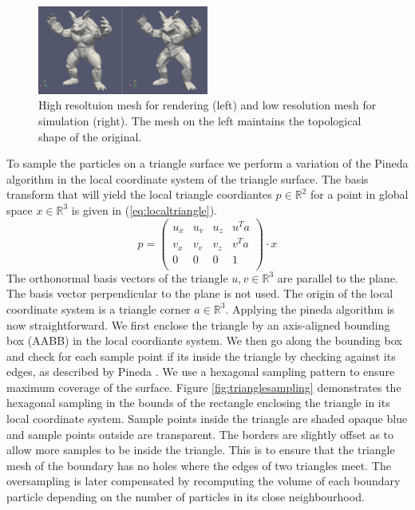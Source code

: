 \documentclass[11pt, letterpaper, twocolumn]{article}
\begin{document}
\begin{figure}[ht]
    \centering
    \includegraphics[width=0.5\textwidth]{images/mesh.png}
    \caption{High resoltuion mesh for rendering (left) and low resolution mesh for simulation (right). The mesh on the left maintains the topological shape of the original.}
    \label{fig:mesh}
\end{figure}
To sample the particles on a triangle surface we perform a variation of the Pineda algorithm \cite{pineda1988} in the local coordinate system of the triangle surface.
The basis transform that will yield the local triangle coordiantes \(p \in \mathbb{R}^2\) for a point in global space \(x \in \mathbb{R}^3\) is given in (\ref{eq:localtriangle}).
\begin{equation}
  p = 
  \begin{pmatrix}
    u_x & u_v & u_z & u^T a\\
    v_x & v_v & v_z & v^T a\\
    0 & 0 & 0 & 1 \\
  \end{pmatrix}
  \cdot x 
\label{eq:localtriangle}
\end{equation}
The orthonormal basis vectors of the triangle \(u, v \in \mathbb{R}^3\) are parallel to the plane. The basis vector perpendicular to the plane is not used. The origin of the local coordinate system is a triangle corner \(a \in \mathbb{R}^3\).
Applying the pineda algorithm is now straightforward. We first enclose the triangle by an axis-aligned bounding box (AABB) in the local coordiante system.
We then go along the bounding box and check for each sample point if its inside the triangle by checking against its edges, as described by Pineda \cite{pineda1988}.
We use a hexagonal sampling pattern to ensure maximum coverage of the surface. Figure \ref{fig:trianglesampling} demonstrates the hexagonal sampling in the bounds of the rectangle enclosing the triangle in its local coordinate system. Sample points inside the triangle are shaded opaque blue and sample points outside are transparent. The borders are slightly offset as to allow more samples to be inside the triangle. This is to ensure that the triangle mesh of the boundary has no holes where the edges of two triangles meet.
The oversampling is later compensated by recomputing the volume of each boundary particle depending on the number of particles in its close neighbourhood.
\end{document}
